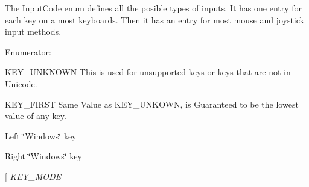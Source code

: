 The InputCode enum defines all the posible types of inputs. It has one entry for each key on a most keyboards. Then it has an entry for most mouse and joystick input methods. \begin{Desc}
\item[Enumerator: ]\par
\begin{description}
\item[{\em 
\hypertarget{classphys_1_1MetaCode_a3e501cbb5bf0f6f1fdb7211465bda8d8a45d7f3824a440f5bea5e616a6d6ea0b5}{
KEY\_\-FIRST}
\label{da/dc9/classphys_1_1MetaCode_a3e501cbb5bf0f6f1fdb7211465bda8d8a45d7f3824a440f5bea5e616a6d6ea0b5}
}]KEY\_\-UNKNOWN This is used for unsupported keys or keys that are not in Unicode. \item[{\em 
\hypertarget{classphys_1_1MetaCode_a3e501cbb5bf0f6f1fdb7211465bda8d8a4d638427d434a0b52d2740ed66c2d1e2}{
KEY\_\-BACKSPACE}
\label{da/dc9/classphys_1_1MetaCode_a3e501cbb5bf0f6f1fdb7211465bda8d8a4d638427d434a0b52d2740ed66c2d1e2}
}]KEY\_\-FIRST Same Value as KEY\_\-UNKOWN, is Guaranteed to be the lowest value of any key. \item[{\em 
\hypertarget{classphys_1_1MetaCode_a3e501cbb5bf0f6f1fdb7211465bda8d8aab77afaba4fc97faa9b9fe40d3a9ebbb}{
KEY\_\-LSUPER}
\label{da/dc9/classphys_1_1MetaCode_a3e501cbb5bf0f6f1fdb7211465bda8d8aab77afaba4fc97faa9b9fe40d3a9ebbb}
}]Left \char`\"{}Windows\char`\"{} key \item[{\em 
\hypertarget{classphys_1_1MetaCode_a3e501cbb5bf0f6f1fdb7211465bda8d8a84e2235ece031f83821867486ff52149}{
KEY\_\-RSUPER}
\label{da/dc9/classphys_1_1MetaCode_a3e501cbb5bf0f6f1fdb7211465bda8d8a84e2235ece031f83821867486ff52149}
}]Right \char`\"{}Windows\char`\"{} key \item[{\em 
\hypertarget{classphys_1_1MetaCode_a3e501cbb5bf0f6f1fdb7211465bda8d8a9e26ea2006e876ccaa80fe4ae441da46}{
KEY\_\-MODE}
}
\end{description}
\end{Desc}
